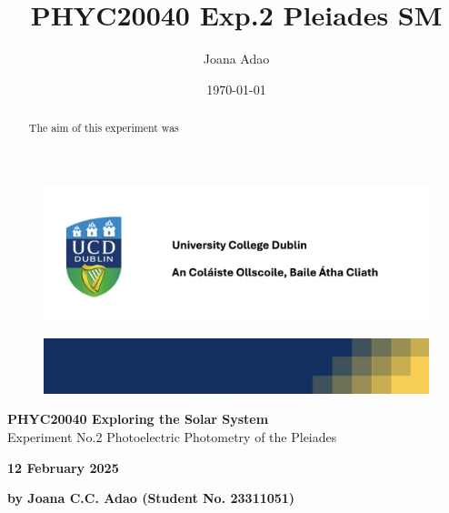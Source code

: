 \documentclass[12pt]{article}
\title{PHYC20040 Exp.2 Pleiades SM}
\author{Joana Adao}
\date{\today}
\begin{document}
\begin{titlepage}
    \begin{center}

        \begin{figure}[ht]
            \includegraphics[width=\textwidth]{UCDLogo.png}
        \end{figure}
        
        \begin{figure}
            \centerline{\includegraphics[width=\paperwidth]{UCDBanner.png}}
        \end{figure}

        \vspace{4cm}

        {\LARGE \bfseries PHYC20040 Exploring the Solar System}\\
        \vspace{0.75cm}
        {\Large Experiment No.2 Photoelectric Photometry of the Pleiades}
        
        \vspace{1cm}
    
    {\Large \textbf{12 February 2025}}

    \vspace{2cm}
    
    {\large \textbf{by Joana C.C. Adao (Student No. 23311051)}}\\

    \end{center}
    
   \clearpage

\end{titlepage}

\setcounter{page}{1}
\tableofcontents

\newpage

\begin{abstract}

\vspace{1cm}

The aim of this experiment was 

\end{abstract}
\end{document}
